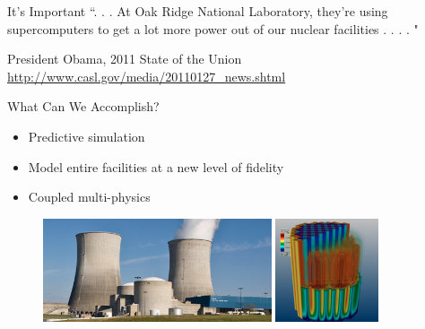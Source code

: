 \documentclass[xcolor=x11names,compress]{beamer}
\renewcommand{\(}{\begin{columns}}
\renewcommand{\)}{\end{columns}}
\newcommand{\<}[1]{\begin{column}{#1}}
\renewcommand{\>}{\end{column}}
\begin{document}
\begin{frame}{It's Important}
``. . . At Oak Ridge National Laboratory, they're using supercomputers to get a lot more power out of our nuclear facilities . . . . "

\vspace*{0.5 in}
President Obama, 2011 State of the Union\\
\href{http://www.casl.gov/media/20110127\_news.shtml}{http://www.casl.gov/media/20110127\_news.shtml}
\end{frame}

\begin{frame}{What Can We Accomplish?}
\begin{itemize}
\item Predictive simulation 
\item Model entire facilities at a new level of fidelity
\item Coupled multi-physics
\end{itemize}
\begin{figure}
\includegraphics[height=1.2in,clip]{WattsBar}
\hfill
\includegraphics[height=1.2in,clip]{DenovoCore}
\end{figure}
\end{frame}
\end{document}
